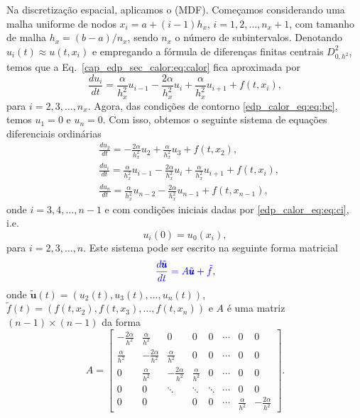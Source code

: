 Na discretização espacial, aplicamos o  (MDF). Começamos considerando uma malha uniforme de nodos $x_i = a + (i-1)h_x$, $i = 1, 2, \dotsc, n_x+1$, com tamanho de malha $h_x = (b-a)/n_x$, sendo $n_x$ o número de subintervalos. Denotando $u_i(t) \approx u(t, x_i)$ e empregando a fórmula de diferenças finitas centrais $D^2_{0,h^2}$, temos que a Eq.~\eqref{cap_edp_sec_calor:eq:calor} fica aproximada por
\begin{equation}
  \frac{d u_{i}}{d t} = \frac{\alpha}{h_x^2}u_{i-1}-\frac{2\alpha}{h_x^2}u_i + \frac{\alpha}{h_x^2}u_{i+1} + f(t,x_i),
\end{equation}
para $i=2, 3, \dotsc, n_x$. Agora, das condições de contorno \eqref{edp_calor_eq:eq:bc}, temos $u_1=0$ e $u_n=0$. Com isso, obtemos o seguinte sistema de equações diferenciais ordinárias
\begin{subequations}
  \begin{align}
    &\frac{d u_2}{d t} = -\frac{2\alpha}{h_x^2}u_{2} + \frac{\alpha}{h_x^2}u_{3} + f(t,x_2),\\
    &\frac{d u_i}{d t} = \frac{\alpha}{h_x^2}u_{i-1} - \frac{2\alpha}{h_x^2}u_{i} +\frac{\alpha}{h_x^2}u_{i+1} + f(t,x_i),\\
    &\frac{d u_{n}}{d t} = \frac{\alpha}{h_x^2}u_{n-2} - \frac{2\alpha}{h_x^2}u_{n-1}  + f(t,x_{n-1}),
  \end{align}
\end{subequations}
onde $i=3, 4, \dotsc, n-1$ e com condições iniciais dadas por \eqref{edp_calor_eq:eq:ci}, i.e.
\begin{equation}
  u_i(0) = u_0(x_i),
\end{equation}
para $i=2, 3, \dotsc, n$. Este sistema pode ser escrito na seguinte forma matricial
\begin{equation}\label{cap_edp_sec_calor:eq:sis}\color{blue}\frac{d \tilde{\pmb{u}}}{d t} = A\tilde{\pmb{u}} + \tilde{f},
\end{equation}
onde $\tilde{\pmb{u}}(t) = (u_2(t), u_3(t), \dotsc, u_{n}(t))$, $\tilde{f}(t) = (f(t,x_2), f(t,x_3), \dotsc, f(t,x_{n}))$ e $A$ é uma matriz $(n-1)\times (n-1)$ da forma
\begin{equation}\label{cap_edp_sec_calor:eq:mat}
  A =
  \begin{bmatrix}
    -\frac{2\alpha}{h^2} & \frac{\alpha}{h^2} & 0 & 0 & 0 & \cdots & 0 & 0\\
    \frac{\alpha}{h^2} & -\frac{2\alpha}{h^2} & \frac{\alpha}{h^2} & 0 & 0 & \cdots & 0 & 0\\
    0 & \frac{\alpha}{h^2} & -\frac{2\alpha}{h^2} & \frac{\alpha}{h^2} & 0 & \cdots & 0 & 0\\
    0 & 0 & \ddots & \ddots & \ddots & \cdots & 0 & 0\\
    0 & 0 & & 0 & 0 & \cdots & \frac{\alpha}{h^2} & -\frac{2\alpha}{h^2}
  \end{bmatrix}.
\end{equation}


